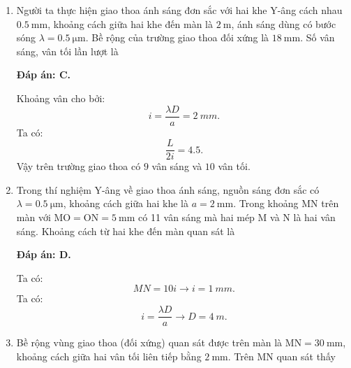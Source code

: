 \begin{enumerate}[label=\bfseries Câu \arabic*:]
{	}
	
	\item {}
	
	\cauhoi
	{Người ta thực hiện giao thoa ánh sáng đơn sắc với hai khe Y-âng cách nhau $\SI{0.5}{\milli \meter}$, khoảng cách giữa hai khe đến màn là $\SI{2}{\meter}$, ánh sáng dùng có bước sóng $\lambda=\SI{0.5}{\micro \meter}$. Bề rộng của trường giao thoa đối xứng là $\SI{18}{\milli \meter}$. Số vân sáng, vân tối lần lượt là
	}
	
		
	\loigiai
	{		\textbf{Đáp án: C.}

Khoảng vân cho bởi:
$$
	i = \dfrac{\lambda D}{a} = \SI{2}{mm}.
$$
Ta có:
$$
	\dfrac{L}{2i}=\num{4,5}.
$$
Vậy trên trường giao thoa có $ 9 $ vân sáng và $ 10 $ vân tối.
		
	}
	

	
	\item {} 
	
	\cauhoi
	{Trong thí nghiệm Y-âng về giao thoa ánh sáng, nguồn sáng đơn sắc có $\lambda=\SI{0.5}{\micro \meter}$, khoảng cách giữa hai khe là $a=\SI{2}{\milli \meter}$. Trong khoảng MN trên màn với $\text{MO}=\text{ON}=\SI{5}{\milli \meter}$ có 11 vân sáng mà hai mép M và N là hai vân sáng. Khoảng cách từ hai khe đến màn quan sát là
	}
	
	\loigiai
	{		\textbf{Đáp án: D.}
		
Ta có:
$$
	MN = 10i \rightarrow i = \SI{1}{mm}.
$$
Ta có:
$$
	i = \dfrac{\lambda D}{a} \rightarrow D = \SI{4}{m}.
$$
		
	}
	
\item {} 
	
	\cauhoi
	{Bề rộng vùng giao thoa (đối xứng) quan sát được trên màn là $\text{MN}=\SI{30}{\milli \meter}$, khoảng cách giữa hai vân tối liên tiếp bằng $\SI{2}{\milli \meter}$. Trên MN quan sát thấy 
	}
	

\end{enumerate}
